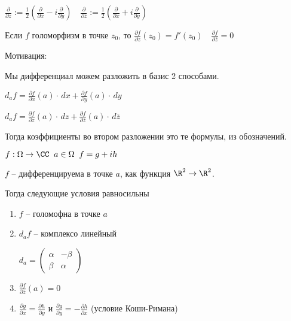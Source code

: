 

\begin{designations}
	$\frac{\partial}{\partial z}:= \frac{1}{2}\left( \frac{\partial}{\partial x} - i\frac{\partial}{\partial y}\right) \quad \frac{\partial}{\partial \bar{z}}:= \frac{1}{2}\left( \frac{\partial}{\partial x} + i\frac{\partial}{\partial y}\right)$
\end{designations}

\begin{remark}\thmslashn
	
	Если $f$ голоморфизм в точке $z_0$, то $\frac{\partial f}{\partial z}(z_0) = f'(z_0) \quad \frac{\partial f}{\partial \bar{z}} = 0$
	
\end{remark}

Мотивация: 

Мы дифференциал можем разложить в базис 2 способами. 

$d_a f = \frac{\partial f}{\partial x}(a) \cdot \,dx + \frac{\partial f}{\partial y} (a) \cdot \,dy$

$d_a f = \frac{\partial f}{\partial z}(a) \cdot \,dz + \frac{\partial f}{\partial \bar{z}} (a) \cdot \,d\bar{z}$

Тогда коэффициенты во втором разложении это те формулы, из обозначений.

\begin{theorem}\thmslashn
	
	$f:\Omega \to \CC\;\; a\in \Omega \;\; f = g + ih$
	
	$f$ -- дифференцируема в точке $a$, как функция $\R^2 \to \R^2$. 
	
	Тогда следующие условия равносильны
	
	\begin{enumerate}
		\item 
		$f$ -- голомофна в точке $a$
		
		\item
		$d_af$ -- комплексо линейный 
		
		$d_a = \begin{pmatrix}
		\alpha & -\beta\\
		\beta & \alpha
		\end{pmatrix}$
		
		\item
		$\frac{\partial f}{\partial \bar{z}} (a) = 0$
		
		\item
		$\frac{\partial g}{\partial x} = \frac{\partial h}{\partial y}$ и $\frac{\partial g}{\partial y} = - \frac{\partial h}{\partial x}$ (условие Коши-Римана)
	\end{enumerate}
	
\end{theorem}

